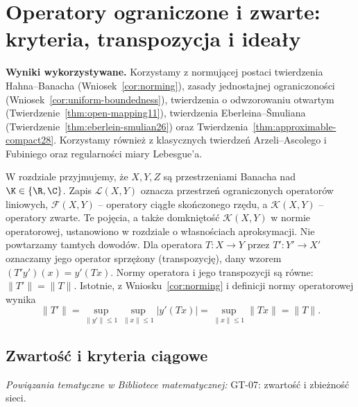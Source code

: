 \setcounter{section}{28}
\section{Operatory ograniczone i zwarte: kryteria, transpozycja i ideały}
\label{sec:operatory29}

\providecommand{\atlasref}[2]{#2}

\noindent\textbf{Wyniki wykorzystywane.}
Korzystamy z normującej postaci twierdzenia Hahna--Banacha
(Wniosek~\ref{cor:norming}), zasady jednostajnej ograniczoności
(Wniosek~\ref{cor:uniform-boundedness}), twierdzenia o odwzorowaniu
otwartym (Twierdzenie~\ref{thm:open-mapping11}), twierdzenia
Eberleina--\v Smuliana (Twierdzenie~\ref{thm:eberlein-smulian26})
oraz Twierdzenia~\ref{thm:approximable-compact28}.
Korzystamy również z klasycznych twierdzeń Arzeli--Ascolego
i Fubiniego oraz regularności miary Lebesgue'a.
\par\medskip

W rozdziale przyjmujemy, że $X,Y,Z$ są przestrzeniami Banacha nad
$\K\in\{\R,\C\}$. Zapis $\mathcal L(X,Y)$ oznacza przestrzeń
ograniczonych operatorów liniowych, $\mathcal F(X,Y)$ -- operatory
ciągłe skończonego rzędu, a $\mathcal K(X,Y)$ -- operatory zwarte.
Te pojęcia, a także domkniętość $\mathcal K(X,Y)$ w normie operatorowej,
ustanowiono w rozdziale o własnościach aproksymacji. Nie powtarzamy
tamtych dowodów. Dla operatora $T:X\to Y$ przez $T':Y'\to X'$
oznaczamy jego operator sprzężony (transpozycję), dany wzorem
$(T'y')(x)=y'(Tx)$. Normy operatora i jego transpozycji są równe:
$\|T'\|=\|T\|$. Istotnie, z Wniosku~\ref{cor:norming}
i definicji normy operatorowej wynika
\[
\|T'\|=\sup_{\|y'\|\le1}\sup_{\|x\|\le1}|y'(Tx)|
=\sup_{\|x\|\le1}\|Tx\|=\|T\|.
\]

\subsection{Zwartość i kryteria ciągowe}

\noindent\emph{Powiązania tematyczne w Bibliotece matematycznej:} \atlasref{GT-07::thm:topog-zwartosc-sieci}{GT-07: zwartość i zbieżność sieci}.


